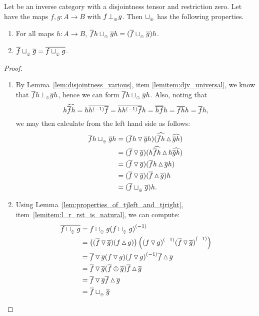 \begin{lemma}\label{lem:tensor_disjoint_join_properties}
  Let \X be an inverse category with a disjointness tensor and restriction zero. Let \X have the
  maps $f,g: A \to B$ with $f{}_{{}_{}}{\perp_{{}_{\oplus}}} g$. Then $\sqcup_{{_{\oplus}}}$ has the following properties.
  \begin{enumerate}[{(}i{)}]
    \item For all maps $h:A \to B$, $\overline{f}h \sqcup_{{_{\oplus}}} \overline{g}h = (\overline{f}\sqcup_{{_{\oplus}}} \overline{g})h$. \label{lemitem:tdj_rst_universal}
    \item $\overline{f}\sqcup_{{_{\oplus}}} \overline{g} = \overline{f\sqcup_{{_{\oplus}}} g}$. \label{lemitem:tdj_rst_is_rst}
  \end{enumerate}
\end{lemma}
\begin{proof}
  \begin{enumerate}[{(}i{)}]
    \item By Lemma~\ref{lem:disjointness_various}, item \ref{lemitem:djv_universal}, we know that
    $\overline{f}h {}_{{}_{}}{\perp_{{}_{\oplus}}} \overline{g} h$, hence we can form $\overline{f}h \sqcup_{{_{\oplus}}} \overline{g}h$.
    Also, noting that
      \[
        h \widehat{\overline{f} h} = h \overline{{h}^{(-1)}\overline{f}} = \overline{h {h}^{(-1)} \overline{f}} h
          = \overline{\overline{h}\overline{f}} h = \overline{f} \overline{h}h = \overline{f} h,
      \]
      we may then calculate from the left hand side as follows:
      \begin{align*}
        \overline{f}h \sqcup_{{_{\oplus}}} \overline{g}h
          & = (\overline{f}h \operatorname{\triangledown} \overline{g} h) (\widehat{\overline{f}h}\operatorname{\vartriangle}\widehat{\overline{g} h})\\
          & = (\overline{f} \operatorname{\triangledown} \overline{g} ) (h\widehat{\overline{f}h}\operatorname{\vartriangle} h\widehat{\overline{g} h})\\
          & = (\overline{f} \operatorname{\triangledown} \overline{g} ) (\overline{f}h\operatorname{\vartriangle} \overline{g} h)\\
          & = (\overline{f} \operatorname{\triangledown} \overline{g} ) (\overline{f}\operatorname{\vartriangle} \overline{g} )h\\
          & = (\overline{f} \sqcup_{{_{\oplus}}} \overline{g} ) h.
      \end{align*}
    \item
    Using Lemma~\ref{lem:properties_of_tjleft_and_tjright}, item~\ref{lemitem:l_r_rst_is_natural},
    we can compute:
    \begin{align*}
      \overline{f\sqcup_{{_{\oplus}}} g} & = f \sqcup_{{_{\oplus}}} g {(f\sqcup_{{_{\oplus}}} g)}^{(-1)} \\
      & = \left((\overline{f} \operatorname{\triangledown} \overline{g})(f\operatorname{\vartriangle} g)\right)
             \left({(f\operatorname{\triangledown} g)}^{(-1)} {(\overline{f}\operatorname{\triangledown} \overline{g})}^{(-1)}\right)\\
      & = \overline{f}\operatorname{\triangledown}\overline{g}(f\operatorname{\triangledown} g) {(f\operatorname{\triangledown} g)}^{(-1)} \overline{f}\operatorname{\vartriangle} \overline{g}\\
      & = \overline{f}\operatorname{\triangledown}\overline{g}(\overline{f}\oplus \overline{g})\overline{f}\operatorname{\vartriangle} \overline{g}\\
      & = \overline{f}\operatorname{\triangledown}\overline{g}\overline{f}\operatorname{\vartriangle} \overline{g}\\
      & = \overline{f}\sqcup_{{_{\oplus}}}\overline{g}
    \end{align*}
  \end{enumerate}
\end{proof}


